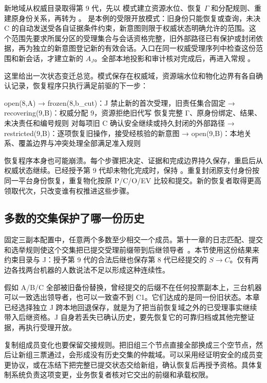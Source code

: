新地域从权威目录取得第 9 代，先以  模式建立资源水位、恢复 $\Gamma$ 和分配规则、重建原身份关系，再转为 。 是本例的受限开放模式：旧身份只能恢复或查询，未决 C 的自动发送受各自证据条件约束，新意图则限于权威状态明确允许的范围。这个范围先要求所属分区的受理集合与会话资格完整，旧外部路径已有保护或封闭依据，再为独立的新意图登记新的有效会话。入口在同一权威受理序列中检查这份范围和新会话，才建立新的 $A_J$。全部本地投影和审计核对完成后，再进入常规 。


这里给出一次状态变迁总览。模式保存在权威域，资源端水位和物化边界有各自确认记录，恢复程序只执行满足前驱的下一步：

\begin{BookCode}
open(8,A)
  → frozen(8,b_cut)：J 禁止新的首次受理，旧责任集合固定
  → recovering(9,B)：权威分配 9，资源拒绝旧代写
      恢复完整 Γ、原身份绑定、结果、未决责任和编号规则
      对每项旧 C 确认安全继续或持久封闭的外部路径
  → restricted(9,B)：逐项恢复旧操作，接受经核验的新意图
  → open(9,B)：本地关系、覆盖边界与冲突处理全部满足准入规则
\end{BookCode}

恢复程序本身也可能崩溃。每个步骤把决定、证据和完成边界持久保存，重启后从权威状态继续。已经授予第 9 代却未物化完成时，保持 。重复封闭原支付身份按同一平台身份恢复，重复物化按原 P/C/O/EV 比较和提交。新的恢复者取得更高领取代次，只改变谁有权推进这些步骤。

\subsection*{多数的交集保护了哪一份历史}

固定三副本配置中，任意两个多数至少相交一个成员。第十一章的日志匹配、提交和选举规则使这个交集把已提交受理前缀带到后继领导者~\cite{raft}。本节使用这份结果来约束目录与 J：授予第 9 代的合法后继也保存第 8 代已经提交的 $S\to C$。仅有两边各找两台机器的人数说法不足以形成这种连续性。

假如 A/B/C 全部被旧备份替换，曾经提交的后缀不在任何投票副本上，三台机器可以一致选出领导者，也可以一致查不到 C1。它们达成的是同一份旧状态。本章已经选择独立 J 跨本地回退保存，就是为了把当前恢复域之外的已受理事实继续带入后继资格。J 自身若丢失已确认历史，要先恢复它的可靠归档或其他完整证据，再执行受理开放。

复制组成员变化也要保留交接规则。把旧组三个节点直接全部换成三个空节点，然后让新组三票通过，会形成没有历史交集的仲裁域。可以采用经证明安全的成员变更协议，或在冻结下把完整已提交状态交给新组，确认恢复后再授予资格。具体复制系统负责这项变更，业务恢复者核对它交出的前缀和承载权限。

